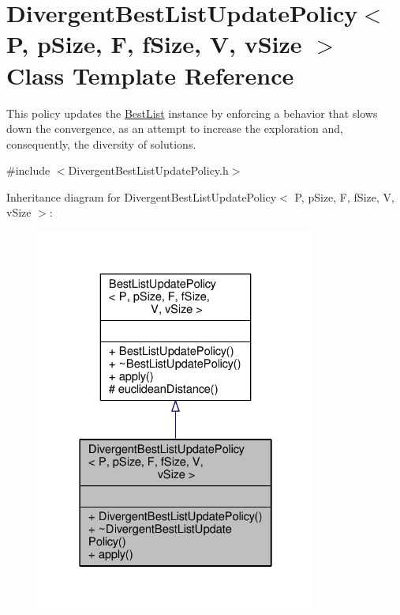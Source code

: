 \hypertarget{classDivergentBestListUpdatePolicy}{}\section{Divergent\+Best\+List\+Update\+Policy$<$ P, p\+Size, F, f\+Size, V, v\+Size $>$ Class Template Reference}
\label{classDivergentBestListUpdatePolicy}


This policy updates the \hyperlink{classBestList}{Best\+List} instance by enforcing a behavior that slows down the convergence, as an attempt to increase the exploration and, consequently, the diversity of solutions.  




{\ttfamily \#include $<$Divergent\+Best\+List\+Update\+Policy.\+h$>$}



Inheritance diagram for Divergent\+Best\+List\+Update\+Policy$<$ P, p\+Size, F, f\+Size, V, v\+Size $>$\+:\nopagebreak
\begin{figure}[H]
\begin{center}
\leavevmode
\includegraphics[width=262pt]{classDivergentBestListUpdatePolicy__inherit__graph}
\end{center}
\end{figure}


